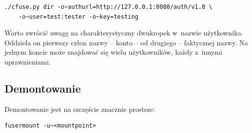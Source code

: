 \begin{verbatim}
./cfuse.py dir -o~authurl=http://127.0.0.1:8080/auth/v1.0 \
    -o~user=test:tester -o~key=testing
\end{verbatim}

Warto zwrócić uwagę na charakterystyczny dwukropek w~nazwie użytkownika.
Oddziela on pierwszy człon nazwy -- konto -- od drugiego -- faktycznej nazwy.
Na jednym koncie może znajdować się wielu użytkowników, każdy z~innymi
uprawnieniami.

\subsection{Demontowanie}

Demontowanie jest na szczęście znacznie prostsze:

\begin{verbatim}
fusermount -u~<mountpoint>
\end{verbatim}





